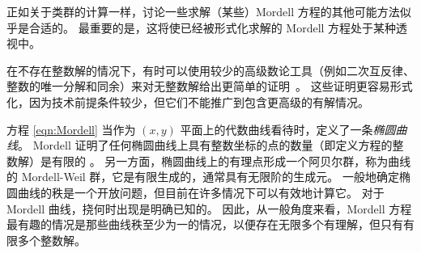 \documentclass[sigplan,10pt,nonacm,
screen]{acmart} \settopmatter{printfolios=true,printccs=false,printacmref=false}
\newcommand{\nc}[1]{\todo[color=magenta]{NC: #1}}
\begin{document}
正如关于类群的计算一样，讨论一些求解（某些）Mordell 方程的其他可能方法似乎是合适的。
最重要的是，这将使已经被形式化求解的 Mordell 方程处于某种透视中。

在不存在整数解的情况下，有时可以使用较少的高级数论工具（例如二次互反律、整数的唯一分解和同余）来对无整数解给出更简单的证明~\cite[第 XXIII 章]{dickson_history_2}。
这些证明更容易形式化，因为技术前提条件较少，但它们不能推广到包含更高级的有解情况。

方程 \eqref{eqn:Mordell} 当作为 $(x,y)$ 平面上的代数曲线看待时，定义了一条\emph{椭圆曲线}。
Mordell 证明了任何椭圆曲线上具有整数坐标的点的数量（即定义方程的整数解）是有限的 \cite{mordell23}。
另一方面，椭圆曲线上的有理点形成一个阿贝尔群，称为曲线的 Mordell-Weil 群，它是有限生成的，通常具有无限阶的生成元。
一般地确定椭圆曲线的秩是一个开放问题，但目前在许多情况下可以有效地计算它。
对于 Mordell 曲线，挠何时出现是明确已知的。%
因此，从一般角度来看，Mordell 方程最有趣的情况是那些曲线秩至少为一的情况，以便存在无限多个有理解，但只有有限多个整数解。
\end{document}
